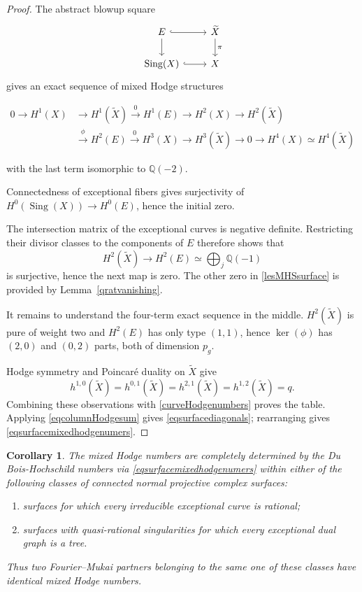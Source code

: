 \documentclass{amsart}
\theoremstyle{plain}
\newtheorem{corollary}[prop]{Corollary}
\theoremstyle{definition}
\newcommand{\ra}{\rightarrow}
\newcommand{\bbQ}{\mathbb{Q}}
\DeclareMathOperator{\Sing}{Sing}
\begin{document}
\begin{proof}
The abstract blowup square
\[
\begin{tikzcd}
E \arrow[r,hook] \arrow[d]
  & \widetilde X \arrow[d,"\pi"]\\
\Sing(X) \arrow[r,hook]
  & X
\end{tikzcd}
\]
gives an exact sequence of mixed Hodge structures

\begin{equation}\label{lesMHSsurface}
\begin{aligned}
0\longrightarrow H^1(X)
&\longrightarrow H^1(\widetilde X)
\xrightarrow{0} H^1(E)
\longrightarrow H^2(X)
\longrightarrow H^2(\widetilde X)\\
&\xrightarrow{\phi} H^2(E)
\xrightarrow{0} H^3(X)
\longrightarrow H^3(\widetilde X)
\longrightarrow0\longrightarrow H^4(X)\simeq H^4(\widetilde X)
\end{aligned}
\end{equation}

with the last term isomorphic to $\bbQ(-2)$.

Connectedness of exceptional fibers gives surjectivity of $H^0(\Sing(X))\ra H^0(E)$, hence the initial zero.

The intersection matrix of the exceptional curves is negative definite. Restricting their divisor classes to the components of $E$ therefore shows that
\[
H^2(\widetilde X)\longrightarrow
H^2(E)\simeq\bigoplus_j\bbQ(-1)
\]
is surjective, hence the next map is zero. The other zero in \eqref{lesMHSsurface} is provided by Lemma~\ref{qratvanishing}.

It remains to understand the four-term exact sequence in the middle. 
$H^2(\widetilde X)$ is pure of weight two and $H^2(E)$
has only type $(1,1)$, hence $\ker(\phi)$ has $(2,0)$ and $(0,2)$ parts, both of dimension $p_g$.

Hodge symmetry and Poincar\'e duality on
$\widetilde X$ give
\[
h^{1,0}(\widetilde X)=h^{0,1}(\widetilde X)
=h^{2,1}(\widetilde X)=h^{1,2}(\widetilde X)=q.
\]
Combining these observations with \eqref{curveHodgenumbers} proves the table. Applying
\eqref{eqcolumnHodgesum} gives
\eqref{eqsurfacediagonals}; rearranging gives
\eqref{eqsurfacemixedhodgenumers}.
\end{proof}




\begin{corollary}\label{corsurfacereconstruction}
The mixed Hodge numbers are completely determined by the Du Bois-Hochschild numbers via \eqref{eqsurfacemixedhodgenumers} within either of the following classes of connected normal projective complex surfaces:
\begin{enumerate}
\item surfaces for which every irreducible exceptional curve is rational;
\item surfaces with quasi-rational singularities for which every exceptional dual graph is a tree.
\end{enumerate}
Thus two Fourier--Mukai partners belonging to the same one of these classes have identical mixed Hodge numbers.
\end{corollary}
\end{document}
